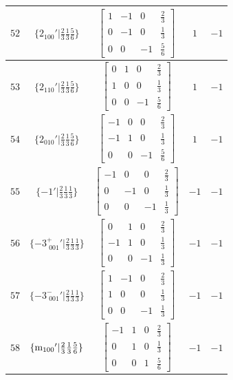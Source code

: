 \documentclass[fleqn,8pt]{jsarticle}
\begin{document}
\begin{longtable}{ccccc}
$ 52 $ & $ \{2{}_{100}{}'|\frac{2}{3} \frac{1}{3} \frac{5}{6}\} $ & $ \begin{bmatrix} 1 & -1 & 0 & \frac{2}{3} \\ 0 & -1 & 0 & \frac{1}{3} \\ 0 & 0 & -1 & \frac{5}{6} \end{bmatrix} $ & $ 1 $ & $ -1 $ \\ \hline
$ 53 $ & $ \{2{}_{110}{}'|\frac{2}{3} \frac{1}{3} \frac{5}{6}\} $ & $ \begin{bmatrix} 0 & 1 & 0 & \frac{2}{3} \\ 1 & 0 & 0 & \frac{1}{3} \\ 0 & 0 & -1 & \frac{5}{6} \end{bmatrix} $ & $ 1 $ & $ -1 $ \\ \hline
$ 54 $ & $ \{2{}_{010}{}'|\frac{2}{3} \frac{1}{3} \frac{5}{6}\} $ & $ \begin{bmatrix} -1 & 0 & 0 & \frac{2}{3} \\ -1 & 1 & 0 & \frac{1}{3} \\ 0 & 0 & -1 & \frac{5}{6} \end{bmatrix} $ & $ 1 $ & $ -1 $ \\ \hline
$ 55 $ & $ \{-1{}'|\frac{2}{3} \frac{1}{3} \frac{1}{3}\} $ & $ \begin{bmatrix} -1 & 0 & 0 & \frac{2}{3} \\ 0 & -1 & 0 & \frac{1}{3} \\ 0 & 0 & -1 & \frac{1}{3} \end{bmatrix} $ & $ -1 $ & $ -1 $ \\ \hline
$ 56 $ & $ \{-3^{+}_{\,\,001}{}'|\frac{2}{3} \frac{1}{3} \frac{1}{3}\} $ & $ \begin{bmatrix} 0 & 1 & 0 & \frac{2}{3} \\ -1 & 1 & 0 & \frac{1}{3} \\ 0 & 0 & -1 & \frac{1}{3} \end{bmatrix} $ & $ -1 $ & $ -1 $ \\ \hline
$ 57 $ & $ \{-3^{-}_{\,\,001}{}'|\frac{2}{3} \frac{1}{3} \frac{1}{3}\} $ & $ \begin{bmatrix} 1 & -1 & 0 & \frac{2}{3} \\ 1 & 0 & 0 & \frac{1}{3} \\ 0 & 0 & -1 & \frac{1}{3} \end{bmatrix} $ & $ -1 $ & $ -1 $ \\ \hline
$ 58 $ & $ \{{\rm m}_{100}{}'|\frac{2}{3} \frac{1}{3} \frac{5}{6}\} $ & $ \begin{bmatrix} -1 & 1 & 0 & \frac{2}{3} \\ 0 & 1 & 0 & \frac{1}{3} \\ 0 & 0 & 1 & \frac{5}{6} \end{bmatrix} $ & $ -1 $ & $ -1 $ \\ \hline

\end{longtable}
\end{document}
